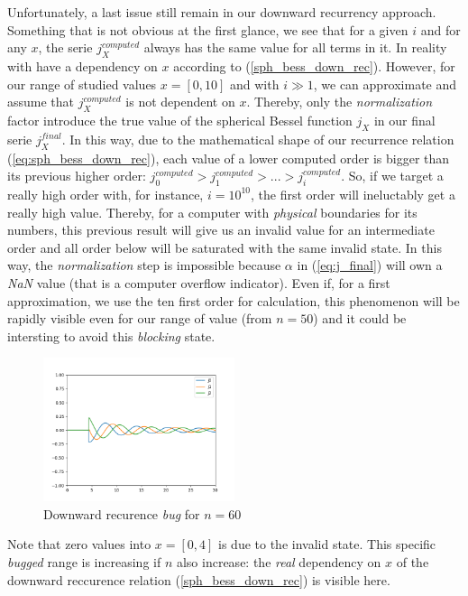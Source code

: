 \documentclass{article}
\numberwithin{equation}{section}
\begin{document}
Unfortunately, a last issue still remain in our downward recurrency approach. Something that is not obvious at the first glance, we see that for a given $i$ and for any $x$, the serie $j^{computed}_{X}$ always has the same value for all terms in it. In reality with have a dependency on $x$ according to (\ref{sph_bess_down_rec}). However, for our range of studied values $x = [0, 10]$ and with $i \gg 1$, we can approximate and assume that $j^{computed}_{X}$ is not dependent on $x$. Thereby, only the \textit{normalization} factor introduce the true value of the spherical Bessel function $j_{X}$ in our final serie $j^{final}_{X}$. In this way, due to the mathematical shape of our recurrence relation (\ref{eq:sph_bess_down_rec}), each value of a lower computed order is bigger than its previous higher order: $j^{computed}_{0} > j^{computed}_{1} > ... > j^{computed}_{i}$. So, if we target a really high order with, for instance, $i=10^{10}$, the first order will ineluctably get a really high value. Thereby, for a computer with \textit{physical} boundaries for its numbers, this previous result will give us an invalid value for an intermediate order and all order below will be saturated with the same invalid state. In this way, the \textit{normalization} step is impossible because $\alpha$ in (\ref{eq:j_final}) will own a \textit{NaN} value (that is a computer overflow indicator). Even if, for a first approximation, we use the ten first order for calculation, this phenomenon will be rapidly visible even for our range of value (from $n=50$) and it could be intersting to avoid this \textit{blocking} state. 
\begin{figure}[h]
    \centering
    \includegraphics[width=0.5\textwidth, height=0.5\textwidth]{jn_bug.png}
    \caption{Downward recurence \textit{bug} for $n=60$}
    \label{fig:jn_bug}
\end{figure}
Note that zero values into $x = [0, 4]$ is due to the invalid state. This specific \textit{bugged} range is increasing if $n$ also increase: the \textit{real} dependency on $x$ of the downward reccurence relation (\ref{sph_bess_down_rec}) is visible here.
\end{document}
